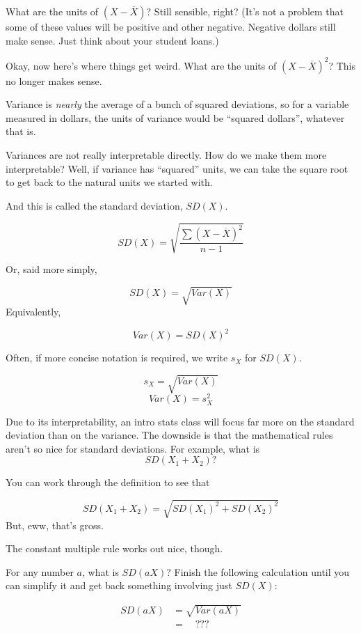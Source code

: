 \documentclass[
]{book}
\begin{document}
What are the units of \(\left(X - \overline{X}\right)\)? Still sensible, right? (It's not a problem that some of these values will be positive and other negative. Negative dollars still make sense. Just think about your student loans.)

Okay, now here's where things get weird. What are the units of \(\left(X - \overline{X}\right)^{2}\)? This no longer makes sense.

Variance is \emph{nearly} the average of a bunch of squared deviations, so for a variable measured in dollars, the units of variance would be ``squared dollars'', whatever that is.

Variances are not really interpretable directly. How do we make them more interpretable? Well, if variance has ``squared'' units, we can take the square root to get back to the natural units we started with.

And this is called the standard deviation, \(SD(X)\).

\[
SD(X) = \sqrt{\frac{\sum{\left(X - \overline{X}\right)^{2}}}
{n - 1}}
\]

Or, said more simply,

\[
SD(X) = \sqrt{Var(X)}
\]
Equivalently,

\[
Var(X) = SD(X)^2
\]

Often, if more concise notation is required, we write \(s_{X}\) for \(SD(X)\).

\[
s_{X} = \sqrt{Var(X)}
\]
\[
Var(X) = s_{X}^2
\]

Due to its interpretability, an intro stats class will focus far more on the standard deviation than on the variance. The downside is that the mathematical rules aren't so nice for standard deviations. For example, what is
\[
SD\left(X_{1} + X_{2}\right)?
\]

You can work through the definition to see that

\[
SD\left(X_{1} + X_{2}\right) = \sqrt{
SD\left(X_{1}\right)^{2} + SD\left(X_{2}\right)^{2}
}
\]
But, eww, that's gross.

The constant multiple rule works out nice, though.

For any number \(a\), what is \(SD(aX)\)? Finish the following calculation until you can simplify it and get back something involving just \(SD(X)\):

\begin{align}
SD(aX)  &= \sqrt{Var(aX)} \\
        &= \quad ???
\end{align}
\end{document}
